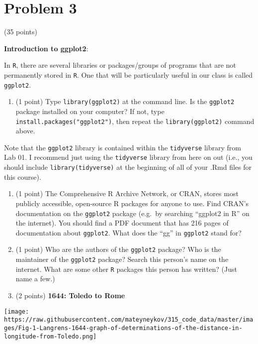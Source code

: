 \documentclass[]{article}
\providecommand{\tightlist}{%
  \setlength{\itemsep}{0pt}\setlength{\parskip}{0pt}}
\begin{document}
\hypertarget{problem-3}{%
\section{Problem 3}\label{problem-3}}

(35 points)

\textbf{Introduction to ggplot2}:

In \texttt{R}, there are several libraries or packages/groups of
programs that are not permanently stored in \texttt{R}. One that will be
particularly useful in our class is called \texttt{ggplot2}.

\begin{enumerate}
\def\labelenumi{\alph{enumi}.}
\tightlist
\item
  (1 point) Type \texttt{library(ggplot2)} at the command line. Is the
  \texttt{ggplot2} package installed on your computer? If not, type
  \texttt{install.packages("ggplot2")}, then repeat the
  \texttt{library(ggplot2)} command above.
\end{enumerate}

Note that the \texttt{ggplot2} library is contained within the
\texttt{tidyverse} library from Lab 01. I recommend just using the
\texttt{tidyverse} library from here on out (i.e., you should include
\texttt{library(tidyverse)} at the beginning of all of your .Rmd files
for this course).

\begin{enumerate}
\def\labelenumi{\alph{enumi}.}
\setcounter{enumi}{1}
\item
  (1 point) The Comprehensive R Archive Network, or CRAN, stores most
  publicly accessible, open-source R packages for anyone to use. Find
  CRAN's documentation on the \texttt{ggplot2} package (e.g.~by
  searching ``ggplot2 in R'' on the internet). You should find a PDF
  document that has 216 pages of documentation about \texttt{ggplot2}.
  What does the ``gg'' in \texttt{ggplot2} stand for?
\item
  (1 point) Who are the authors of the \texttt{ggplot2} package? Who is
  the maintainer of the \texttt{ggplot2} package? Search this person's
  name on the internet. What are some other \texttt{R} packages this
  person has written? (Just name a few.)
\item
  (2 points) \textbf{1644: Toledo to Rome}
\end{enumerate}

\texttt{[image: https://raw.githubusercontent.com/mateyneykov/315\_code\_data/master/images/Fig-1-Langrens-1644-graph-of-determinations-of-the-distance-in-longitude-from-Toledo.png]}
\end{document}
